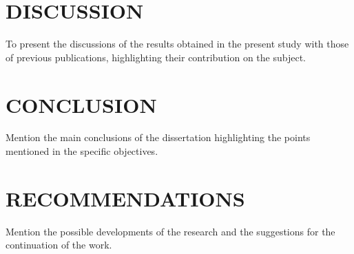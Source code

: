 \lipsum[1-2]

\chapter{DISCUSSION}

To present the discussions of the results obtained in the present study with those of previous publications, highlighting their contribution on the subject.

\chapter{CONCLUSION}

Mention the main conclusions of the dissertation highlighting the points mentioned in the specific objectives.

\chapter{RECOMMENDATIONS}

Mention the possible developments of the research and the suggestions for the continuation of the work.